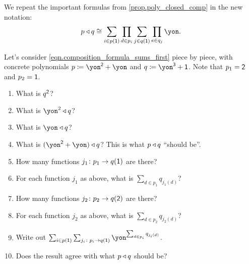 \documentclass[DynamicalBook]{subfiles}
\begin{document}
We repeat the important formulas from \cref{prop.poly_closed_comp} in the new notation:
\begin{equation}\label{eqn.composite_formula}
p\tri q\cong\sum_{i\in p(\1)}\prod_{d\in p_i}\sum_{j\in q(\1)}\prod_{e\in q_j}\yon.
\end{equation}


\begin{exercise}
Let's consider \eqref{eqn.composition_formula_sums_first} piece by piece, with concrete polynomials $p\coloneqq\yon^\2+\yon$ and $q\coloneqq \yon^\3+\1$. Note that $p_1=\textsf{2}$ and $p_2=\textsf{1}$.
\begin{enumerate}
	\item What is $q^{\textsf{2}}$?
	\item What is $\yon^2\tri q$? 
	\item What is $\yon\tri q$?
	\item What is $(\yon^\2+\yon)\tri q$? This is what $p\mathbin{\triangleleft} q$ ``should be''.
	\item How many functions $j_1\colon p_1\to q(\textsf{1})$ are there?
	\item For each function $j_1$ as above, what is $\sum_{d\in p_1} q_{j_1(d)}$?
	\item How many functions $j_2\colon p_2\to q(\textsf{2})$ are there?
	\item For each function $j_2$ as above, what is $\sum_{d\in p_2} q_{j_2(d)}$?
	\item Write out $\sum_{i\in p(\1)}\sum_{j_i\colon p_i\to q(\1)}\yon^{\sum_{d\in p_i}q_{j_i(d)}}$.
	\item Does the result agree with what $p\mathbin{\triangleleft} q$ should be?
\qedhere
\end{enumerate}
\end{exercise}
\end{document}
